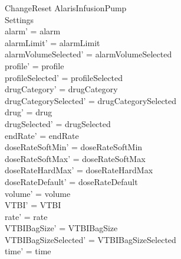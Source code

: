 \begin{schema}{ChangeReset}
	\Delta AlarisInfusionPump\\
	 Settings\\
	\where
	alarm' = alarm\\
	alarmLimit' = alarmLimit\\
	alarmVolumeSelected' = alarmVolumeSelected\\
	profile' = profile\\
	profileSelected' = profileSelected\\
	drugCategory' = drugCategory\\ 
	drugCategorySelected' = drugCategorySelected\\
	drug' = drug\\ 
	drugSelected' = drugSelected\\
	endRate' = endRate\\
	doseRateSoftMin' = doseRateSoftMin\\
	doseRateSoftMax' = doseRateSoftMax\\
	doseRateHardMax' = doseRateHardMax\\
	doseRateDefault' = doseRateDefault\\
	volume' = volume\\
	VTBI' = VTBI\\
	\pagebreak
	rate' = rate\\
	VTBIBagSize' = VTBIBagSize\\ 
	VTBIBagSizeSelected' = VTBIBagSizeSelected\\
	time' = time\\

\end{schema}
